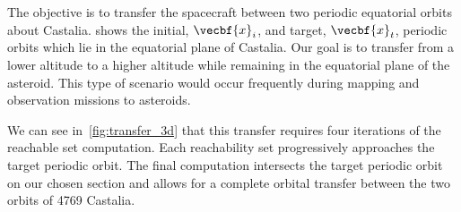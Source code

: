 \documentclass[11pt,reqno]{amsart} %
\begin{document}
\begin{multicols}{2}
The objective is to transfer the spacecraft between two periodic equatorial orbits about Castalia.
 shows the initial, \( \vecbf{x}_i \), and target, \( \vecbf{x}_t\), periodic orbits which lie in the equatorial plane of Castalia.
Our goal is to transfer from a lower altitude to a higher altitude while remaining in the equatorial plane of the asteroid.
This type of scenario would occur frequently during mapping and observation missions to asteroids.

We can see in~\cref{fig:transfer_3d} that this transfer requires four iterations of the reachable set computation. 
Each reachability set progressively approaches the target periodic orbit.
The final computation intersects the target periodic orbit on our chosen \Poincare section and allows for a complete orbital transfer between the two orbits of 4769 Castalia.




\end{multicols}
\end{document}
